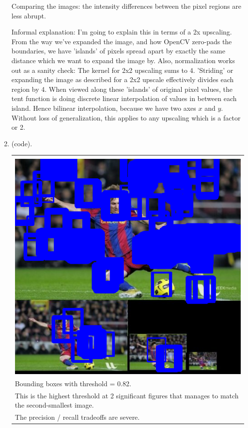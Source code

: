 \documentclass{article}
\begin{document}
\begin{enumerate}[label=(\roman*)]
Comparing the images: the intensity differences between the pixel regions are less abrupt.

Informal explanation: I'm going to explain this in terms of a 2x upscaling. From the way we've expanded the image, and how OpenCV zero-pads the boundaries, we have 'islands' of pixels spread apart by exactly the same distance which we want to expand the image by. Also, normalization works out as a sanity check: The kernel for 2x2 upscaling sums to 4. 'Striding' or expanding the image as described for a 2x2 upscale effectively divides each region by 4. When viewed along these 'islands' of original pixel values, the tent function is doing discrete linear interpolation of values in between each island. Hence bilinear interpolation, because we have two axes $x$ and $y$. Without loss of generalization, this applies to any upscaling which is a factor or 2.

\item %
(code).

\begin{tabular}[t]{l}
	\hline \\
	\includegraphics[width=1.0\textwidth]{img/image_detections.png} \\
	Bounding boxes with threshold = 0.82. \\
	This is the highest threshold at 2 significant figures that manages to match the second-smallest image. \\
	The precision / recall tradeoffs are severe. \\
	\hline
\end{tabular}


\end{enumerate}
\end{document}
